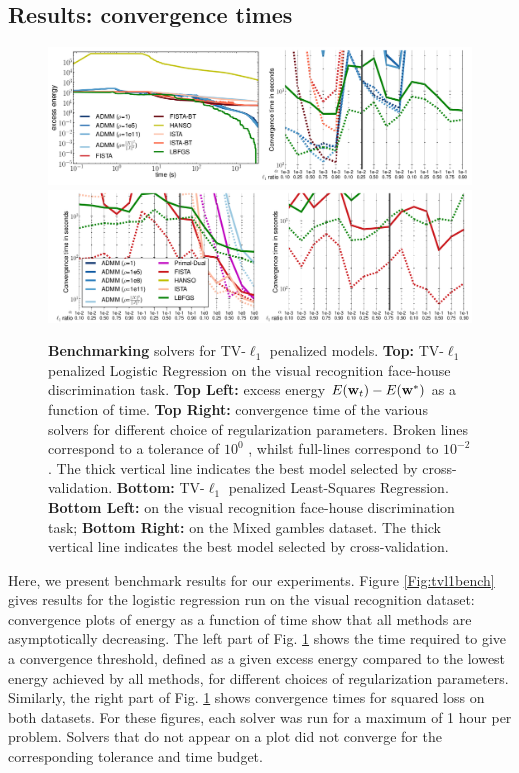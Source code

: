 \subsection{Results: convergence times}
 \begin{figure}[!htbp]
   \includegraphics[width=1\linewidth]{figures/solvers_1.png}
   \includegraphics[width=1\linewidth]{figures/solvers_2.png}
   \caption{\textbf{Benchmarking } solvers for TV-$\ell_1$ penalized models. \textbf{Top:} TV-$\ell_1$ penalized Logistic Regression on the visual recognition face-house discrimination task. \textbf{Top Left:} excess energy $E(\mathbf{w}_t ) - E(\mathbf{w}^*)$ as a function of time. \textbf{Top Right:} convergence time of the various solvers for different choice of regularization parameters. Broken lines correspond to a tolerance of
     $10^0$ , whilst full-lines correspond to $10^{-2}$ . The thick vertical line indicates the best model selected by cross-validation. \textbf{Bottom:} TV-$\ell_1$ penalized Least-Squares Regression. \textbf{Bottom Left:} on the visual recognition face-house discrimination task; \textbf{Bottom Right:} on the Mixed gambles dataset. The thick vertical line indicates the best model selected by cross-validation.}
   \label{fig:tvl1bench}
\end{figure}

\label{sec:results}
Here, we present benchmark results for our experiments. Figure
\ref{Fig:tvl1bench} gives results for the logistic regression run on the
visual recognition dataset: convergence plots of energy as a function of
time show that all methods are asymptotically decreasing. The left part of
Fig. \ref{fig:tvl1bench}
shows the time required to give a convergence
threshold, defined as a given excess energy compared to the lowest energy
achieved by all methods, for different choices of regularization
parameters. Similarly, the right part of Fig. \ref{fig:tvl1bench} shows convergence times
for squared loss on both datasets. For these figures,
each solver was run for a maximum of 1 hour per problem. Solvers that do
not appear on a plot did not converge for the corresponding
tolerance and time budget.

